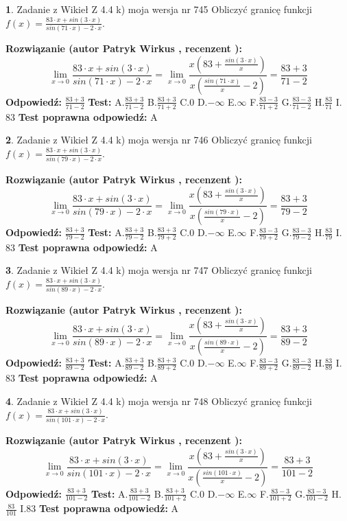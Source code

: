 \documentclass[12pt, a4paper]{article}
\theoremstyle{definition} %
\newtheorem{zad}{}
\newcommand{\zadStart}[1]{\begin{zad}#1\newline}
\newcommand{\zadStop}{\end{zad}}
\newcommand{\rozwStart}[2]{\noindent \textbf{Rozwiązanie (autor #1 , recenzent #2): }\newline}
\newcommand{\rozwStop}{\newline}
\newcommand{\odpStart}{\noindent \textbf{Odpowiedź:}\newline}
\newcommand{\odpStop}{\newline}
\newcommand{\testStart}{\noindent \textbf{Test:}\newline}
\newcommand{\testStop}{\newline}
\newcommand{\kluczStart}{\noindent \textbf{Test poprawna odpowiedź:}\newline}
\newcommand{\kluczStop}{\newline}
\begin{document}
\zadStart{Zadanie z Wikieł Z 4.4 k) moja wersja nr 745}
Obliczyć granicę funkcji $f(x)=\frac{83\cdot x +sin(3\cdot x)}{sin(71\cdot x) -2\cdot x}$.
\zadStop
\rozwStart{Patryk Wirkus}{}
$$\lim\limits_{x\to 0}\frac{83\cdot x +sin(3\cdot x)}{sin(71\cdot x) -2\cdot x}
=\lim\limits_{x\to 0}\frac{x(83+\frac{sin(3\cdot x)}{x})}{x(\frac{sin(71\cdot x)}{x}-2)}
=\frac{83+3}{71-2}$$
\rozwStop
\odpStart
$\frac{83+3}{71-2}$
\odpStop
\testStart
A.$\frac{83+3}{71-2}$
B.$\frac{83+3}{71+2}$
C.$0$
D.$-\infty$
E.$\infty$
F.$\frac{83-3}{71+2}$
G.$\frac{83-3}{71-2}$
H.$\frac{83}{71}$
I.$83$
\testStop
\kluczStart
A
\kluczStop



\zadStart{Zadanie z Wikieł Z 4.4 k) moja wersja nr 746}
Obliczyć granicę funkcji $f(x)=\frac{83\cdot x +sin(3\cdot x)}{sin(79\cdot x) -2\cdot x}$.
\zadStop
\rozwStart{Patryk Wirkus}{}
$$\lim\limits_{x\to 0}\frac{83\cdot x +sin(3\cdot x)}{sin(79\cdot x) -2\cdot x}
=\lim\limits_{x\to 0}\frac{x(83+\frac{sin(3\cdot x)}{x})}{x(\frac{sin(79\cdot x)}{x}-2)}
=\frac{83+3}{79-2}$$
\rozwStop
\odpStart
$\frac{83+3}{79-2}$
\odpStop
\testStart
A.$\frac{83+3}{79-2}$
B.$\frac{83+3}{79+2}$
C.$0$
D.$-\infty$
E.$\infty$
F.$\frac{83-3}{79+2}$
G.$\frac{83-3}{79-2}$
H.$\frac{83}{79}$
I.$83$
\testStop
\kluczStart
A
\kluczStop



\zadStart{Zadanie z Wikieł Z 4.4 k) moja wersja nr 747}
Obliczyć granicę funkcji $f(x)=\frac{83\cdot x +sin(3\cdot x)}{sin(89\cdot x) -2\cdot x}$.
\zadStop
\rozwStart{Patryk Wirkus}{}
$$\lim\limits_{x\to 0}\frac{83\cdot x +sin(3\cdot x)}{sin(89\cdot x) -2\cdot x}
=\lim\limits_{x\to 0}\frac{x(83+\frac{sin(3\cdot x)}{x})}{x(\frac{sin(89\cdot x)}{x}-2)}
=\frac{83+3}{89-2}$$
\rozwStop
\odpStart
$\frac{83+3}{89-2}$
\odpStop
\testStart
A.$\frac{83+3}{89-2}$
B.$\frac{83+3}{89+2}$
C.$0$
D.$-\infty$
E.$\infty$
F.$\frac{83-3}{89+2}$
G.$\frac{83-3}{89-2}$
H.$\frac{83}{89}$
I.$83$
\testStop
\kluczStart
A
\kluczStop



\zadStart{Zadanie z Wikieł Z 4.4 k) moja wersja nr 748}
Obliczyć granicę funkcji $f(x)=\frac{83\cdot x +sin(3\cdot x)}{sin(101\cdot x) -2\cdot x}$.
\zadStop
\rozwStart{Patryk Wirkus}{}
$$\lim\limits_{x\to 0}\frac{83\cdot x +sin(3\cdot x)}{sin(101\cdot x) -2\cdot x}
=\lim\limits_{x\to 0}\frac{x(83+\frac{sin(3\cdot x)}{x})}{x(\frac{sin(101\cdot x)}{x}-2)}
=\frac{83+3}{101-2}$$
\rozwStop
\odpStart
$\frac{83+3}{101-2}$
\odpStop
\testStart
A.$\frac{83+3}{101-2}$
B.$\frac{83+3}{101+2}$
C.$0$
D.$-\infty$
E.$\infty$
F.$\frac{83-3}{101+2}$
G.$\frac{83-3}{101-2}$
H.$\frac{83}{101}$
I.$83$
\testStop
\kluczStart
A
\kluczStop
\end{document}
